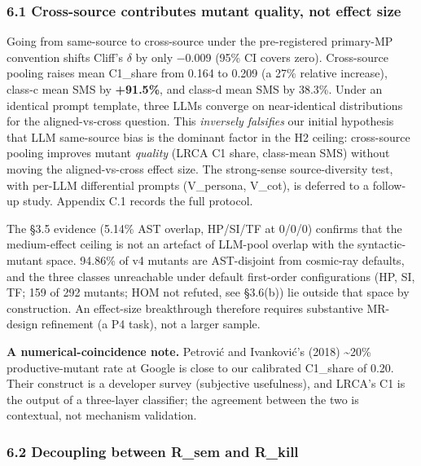 \documentclass[review,12pt,authoryear]{elsarticle}
\begin{document}
\subsubsection{6.1 Cross-source contributes mutant quality, not effect size}\label{cross-source-contributes-mutant-quality-not-effect-size}

Going from same-source to cross-source under the pre-registered
primary-MP convention shifts Cliff's $\delta$ by only −0.009 (95\% CI covers
zero). Cross-source pooling raises mean C1\_share from 0.164 to 0.209 (a
27\% relative increase), class-c mean SMS by \textbf{+91.5\%}, and
class-d mean SMS by 38.3\%. Under an identical prompt template, three
LLMs converge on near-identical distributions for the aligned-vs-cross
question. This \emph{inversely falsifies} our initial hypothesis that
LLM same-source bias is the dominant factor in the H2 ceiling:
cross-source pooling improves mutant \emph{quality} (LRCA C1 share,
class-mean SMS) without moving the aligned-vs-cross effect size. The
strong-sense source-diversity test, with per-LLM differential prompts
(V\_persona, V\_cot), is deferred to a follow-up study. Appendix C.1
records the full protocol.

The §3.5 evidence (5.14\% AST overlap, HP/SI/TF at 0/0/0) confirms that
the medium-effect ceiling is not an artefact of LLM-pool overlap with
the syntactic-mutant space. 94.86\% of v4 mutants are AST-disjoint from
cosmic-ray defaults, and the three classes unreachable under default
first-order configurations (HP, SI, TF; 159 of 292 mutants; HOM not
refuted, see §3.6(b)) lie outside that space by construction. An
effect-size breakthrough therefore requires substantive MR-design
refinement (a P4 task), not a larger sample.

\textbf{A numerical-coincidence note.} Petrović and Ivanković's (2018)
\textasciitilde20\% productive-mutant rate at Google is close to our
calibrated C1\_share of 0.20. Their construct is a developer survey
(subjective usefulness), and LRCA's C1 is the output of a three-layer
classifier; the agreement between the two is contextual, not mechanism
validation.

\subsubsection{6.2 Decoupling between R\_sem and R\_kill}\label{decoupling-between-r_sem-and-r_kill}
\end{document}
